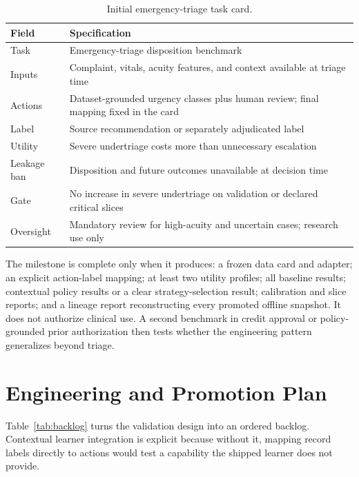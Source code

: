 \documentclass[conference]{IEEEtran}
\begin{document}
\begin{table}[t]
\centering
\caption{Initial emergency-triage task card.}
\label{tab:taskcard}
\renewcommand{\arraystretch}{1.14}
\begin{tabular}{@{}p{1.75cm}p{5.65cm}@{}}
\toprule
\textbf{Field} & \textbf{Specification} \\
\midrule
Task & Emergency-triage disposition benchmark \\
Inputs & Complaint, vitals, acuity features, and context available at triage time \\
Actions & Dataset-grounded urgency classes plus human review; final mapping fixed in the card \\
Label & Source recommendation or separately adjudicated label \\
Utility & Severe undertriage costs more than unnecessary escalation \\
Leakage ban & Disposition and future outcomes unavailable at decision time \\
Gate & No increase in severe undertriage on validation or declared critical slices \\
Oversight & Mandatory review for high-acuity and uncertain cases; research use only \\
\bottomrule
\end{tabular}
\end{table}

The milestone is complete only when it produces: a frozen data card
and adapter; an explicit action-label mapping; at least two utility
profiles; all baseline results; contextual policy results or a clear
strategy-selection result; calibration and slice reports; and a
lineage report reconstructing every promoted offline snapshot. It
does not authorize clinical use. A second benchmark in credit
approval or policy-grounded prior authorization then tests whether
the engineering pattern generalizes beyond triage.

\section{Engineering and Promotion Plan}
\label{sec:roadmap}

Table~\ref{tab:backlog} turns the validation design into an ordered
backlog. Contextual learner integration is explicit because without
it, mapping record labels directly to actions would test a capability
the shipped learner does not provide.
\end{document}
